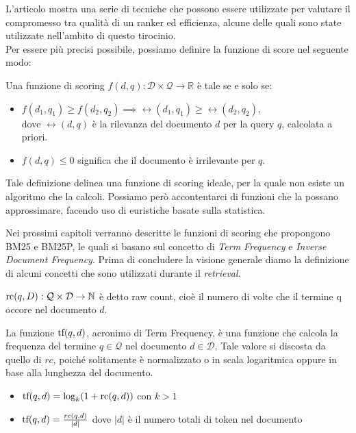 L'articolo \cite{10.1016/j.ipm.2016.05.004} mostra una serie di tecniche che possono essere
utilizzate per valutare il compromesso tra qualità di un ranker ed efficienza, 
alcune delle quali sono state utilizzate nell'ambito di questo tirocinio.\\
Per essere più precisi possibile, possiamo definire la funzione di score nel seguente modo:

\begin{definizione}\label{def:funzione_di_score_ideale}
	Una funzione di scoring $f(d,q) : \mathcal{D} \times \mathcal{Q} \rightarrow \mathbb{R}$ è tale
	se e solo se:
	\begin{itemize}
		\item $f(d_1,q_1) \geq f(d_2, q_2) \implies \rel(d_1, q_1) \geq \rel(d_2, q_2)$,\\ dove $\rel(d,q)$ è la rilevanza del documento $d$ per la query $q$, calcolata a priori.
		\item $f(d,q) \leq 0$ significa che il documento è irrilevante per $q$.
	\end{itemize}
\end{definizione}

Tale definizione delinea una funzione di scoring ideale, per la quale non esiste un algoritmo che
la calcoli. Possiamo però accontentarci di funzioni che la possano approssimare, facendo uso di euristiche basate sulla statistica.

\pagebreak

Nei prossimi capitoli verranno descritte le funzioni di scoring che propongono BM25 e BM25P, le quali si basano sul concetto di \textit{Term Frequency} e \textit{Inverse Document Frequency}.
Prima di concludere la visione generale diamo la definizione di alcuni concetti che sono utilizzati durante il \textit{retrieval}.

\begin{definizione}\label{def:raw_count}
	$\text{rc}(q, D) : \mathcal{Q} \times \mathcal{D} \rightarrow \mathbb{N}$ è detto raw count, cioè il numero di volte che
	il termine q occore nel documento $d$.
\end{definizione}

\begin{definizione}\label{def:}
	La funzione $\text{tf}(q,d)$, acronimo di Term Frequency, è una funzione che calcola la frequenza del
	termine $q \in \mathcal{Q}$ nel documento $d \in \mathcal{D}$.
	Tale valore si discosta da quello di $rc$, poiché solitamente è normalizzato o in scala logaritmica
	oppure in base alla lunghezza del documento.
	
	\begin{itemize}
		\item $\text{tf}(q,d) = \log_{k}(1+\text{rc}(q,d))$ con $k>1$
		\item $\text{tf}(q,d) = \frac{rc(q,d)}{|d|}$ dove $|d|$ è il numero totali di token nel documento
	\end{itemize}
\end{definizione}

